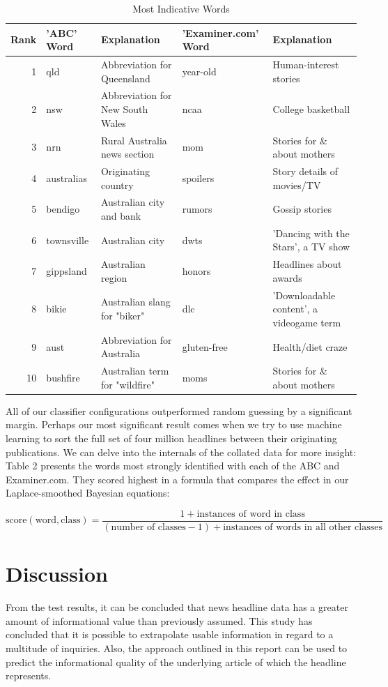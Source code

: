 \documentclass[format=acmlarge]{acmart}
\begin{document}
\begin{table}
  \caption{Most Indicative Words}
  \label{tab:two}
  \begin{tabular}{r|ll|ll}
    Rank & 'ABC' Word & Explanation & 'Examiner.com' Word & Explanation\\
    \hline
    1 & qld & Abbreviation for Queensland & year-old & Human-interest stories\\
    2 & nsw & Abbreviation for New South Wales & ncaa & College basketball\\
    3 & nrn & Rural Australia news section & mom & Stories for \& about mothers\\
    4 & australias & Originating country & spoilers & Story details of movies/TV\\
    5 & bendigo & Australian city and bank & rumors & Gossip stories\\
    6 & townsville & Australian city & dwts & 'Dancing with the Stars', a TV show\\
    7 & gippsland & Australian region & honors & Headlines about awards\\
    8 & bikie & Australian slang for "biker" & dlc & 'Downloadable content', a videogame term\\
    9 & aust & Abbreviation for Australia & gluten-free & Health/diet craze\\
    10 & bushfire & Australian term for "wildfire" & moms & Stories for \& about mothers\\
  \end{tabular}
\end{table}

All of our classifier configurations outperformed random guessing by a significant margin.  Perhaps our most significant result comes when we try to use machine learning to sort the full set of four million headlines between their originating publications.  We can delve into the internals of the collated data for more insight:  Table 2 presents the words most strongly identified with each of the ABC and Examiner.com.  They scored highest in a formula that compares the effect in our Laplace-smoothed Bayesian equations:

$$\textrm{score}(\textrm{word}, \textrm{class}) = \frac{1 + \textrm{instances of word in class}}{(\textrm{number of classes} - 1) + \textrm{instances of words in all other classes}}$$

\section{Discussion}
From the test results, it can be concluded that news headline data has a greater amount of informational value than previously assumed.  This study has concluded that it is possible to extrapolate usable information in regard to a multitude of inquiries.  Also, the approach outlined in this report can be used to predict the informational quality of the underlying article of which the headline represents.
\end{document}
